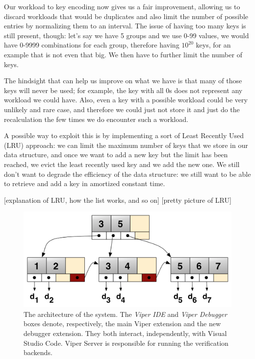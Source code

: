 Our workload to key encoding now gives us a fair improvement, allowing us to discard workloads that would be duplicates and also limit the number of possible entries by normalizing them to an interval. The issue of having too many keys is still present, though: let's say we have 5 groups and we use 0-99 values, we would have 0-9999 combinations for each group, therefore having $10^{20}$ keys, for an example that is not even that big. We then have to further limit the number of keys. 

The hindsight that can help us improve on what we have is that many of those keys will never be used; for example, the key with all 0s does not represent any workload we could have. Also, even a key with a possible workload could be very unlikely and rare case, and therefore we could just not store it and just do the recalculation the few times we do encounter such a workload. 

A possible way to exploit this is by implementing a sort of Least Recently Used (LRU) approach: we can limit the maximum number of keys that we store in our data structure, and once we want to add a new key but the limit has been reached, we evict the least recently used key and we add the new one. We still don't want to degrade the efficiency of the data structure: we still want to be able to retrieve and add a key in amortized constant time.

[explanation of LRU, how the list works, and so on]
[pretty picture of LRU]
\begin{figure}[htb]
  \centering
  \includegraphics[width=\textwidth,height=\textheight,keepaspectratio]{img/b+tree.png}
  \caption[The architecture of the system]{ The architecture of the system. The
    \textit{Viper IDE} and \textit{Viper Debugger} boxes denote, respectively,
    the main Viper extension and the new debugger extension. They both interact,
    independently, with Visual Studio Code. Viper Server is responsible for
    running the verification backends.}
  \label{fig:b+tree}
\end{figure}

